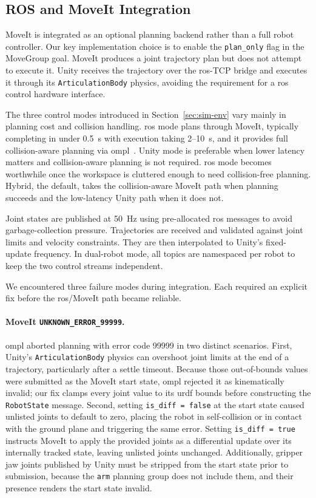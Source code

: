 \documentclass[
     12pt,
     a4paper,
     BCOR=10mm,
     DIV=14,
     listof=totoc,
     bibliography=totoc,
     parskip,
     twoside,
     headsepline
     ]{scrreprt}
\begin{document}
\subsection{ROS and MoveIt Integration}\label{sec:ros_moveit}
MoveIt is integrated as an optional planning backend rather than a full robot controller. Our key implementation choice is to enable the \texttt{plan\_only} flag in the MoveGroup goal. MoveIt produces a joint trajectory plan but does not attempt to execute it. Unity receives the trajectory over the \gls{ros}-TCP bridge and executes it through its \texttt{ArticulationBody} physics, avoiding the requirement for a \gls{ros} control hardware interface.

The three control modes introduced in Section~\ref{sec:sim-env} vary mainly in planning cost and collision handling. \gls{ros} mode plans through MoveIt, typically completing in under 0.5~s with execution taking 2--10~s, and it provides full collision-aware planning via \gls{ompl}~\cite{6377468}. Unity mode is preferable when lower latency matters and collision-aware planning is not required. \gls{ros} mode becomes worthwhile once the workspace is cluttered enough to need collision-free planning. Hybrid, the default, takes the collision-aware MoveIt path when planning succeeds and the low-latency Unity path when it does not.

Joint states are published at 50~Hz using pre-allocated \gls{ros} messages to avoid garbage-collection pressure. Trajectories are received and validated against joint limits and velocity constraints. They are then interpolated to Unity's fixed-update frequency. In dual-robot mode, all topics are namespaced per robot to keep the two control streams independent.

We encountered three failure modes during integration. Each required an explicit fix before the \gls{ros}/MoveIt path became reliable.

\paragraph{MoveIt \texttt{UNKNOWN\_ERROR\_99999}.}
\gls{ompl} aborted planning with error code 99999 in two distinct scenarios. First, Unity's \texttt{ArticulationBody} physics can overshoot joint limits at the end of a trajectory, particularly after a settle timeout. Because those out-of-bounds values were submitted as the MoveIt start state, \gls{ompl} rejected it as kinematically invalid; our fix clamps every joint value to its \gls{urdf} bounds before constructing the \texttt{RobotState} message. Second, setting \texttt{is\_diff = false} at the start state caused unlisted joints to default to zero, placing the robot in self-collision or in contact with the ground plane and triggering the same error. Setting \texttt{is\_diff = true} instructs MoveIt to apply the provided joints as a differential update over its internally tracked state, leaving unlisted joints unchanged. Additionally, gripper jaw joints published by Unity must be stripped from the start state prior to submission, because the \texttt{arm} planning group does not include them, and their presence renders the start state invalid.
\end{document}
